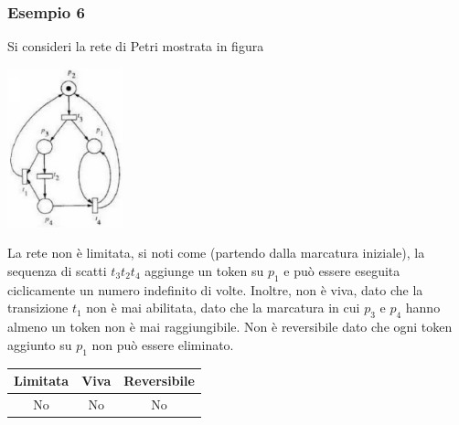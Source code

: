\documentclass[10pt, letterpaper]{report}
\begin{document}
\subsubsection{Esempio 6}
Si consideri la rete di Petri mostrata in figura
\begin{center}
    \includegraphics[width=0.25\textwidth]{images/PetriEs6.png}
\end{center}
La rete non è limitata, si noti come (partendo dalla marcatura iniziale), la sequenza di scatti 
$t_3t_2t_4$ aggiunge un token su $p_1$ e può essere eseguita ciclicamente un numero indefinito di volte. Inoltre, non è viva, dato che la transizione $t_1$ non è mai abilitata, dato che la marcatura in cui $p_3$ e $p_4$ hanno almeno un token non è mai raggiungibile. Non è reversibile dato che ogni token aggiunto su $p_1$ non può essere eliminato.
\begin{center}
    \begin{tabular}{|c|c|c|}
        \hline
        \rowcolor[HTML]{EFEFEF} 
        Limitata & Viva & Reversibile \\ \hline
        No       & No   & No          \\ \hline
        \end{tabular}
\end{center}
\end{document}
